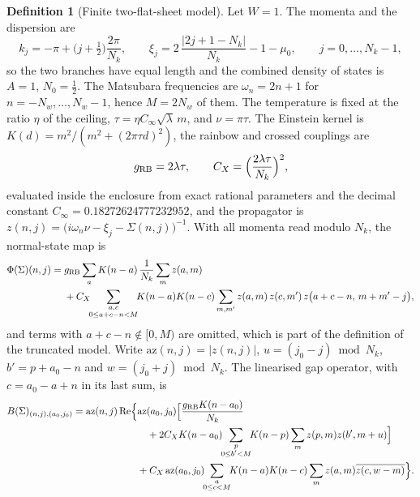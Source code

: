 \documentclass[11pt]{article}
\newcommand{\Cinf}{C_\infty}
\theoremstyle{definition}
\newtheorem{definition}[theorem]{Definition}
\theoremstyle{remark}
\begin{document}
\begin{definition}[Finite two-flat-sheet model]\label{def:cert}
Let $W=1$. The momenta and the dispersion are
\begin{equation}\label{eq:certgrid}
k_j=-\pi+\Big(j+\tfrac12\Big)\frac{2\pi}{N_k},\qquad \xi_j=2\,\frac{|2j+1-N_k|}{N_k}-1-\mu_0,\qquad j=0,\dots,N_k-1,
\end{equation}
so the two branches have equal length and the combined density of states is $A=1$, $N_0=\tfrac12$. The Matsubara frequencies are $\omega_n=2n+1$ for $n=-N_w,\dots,N_w-1$, hence $M=2N_w$ of them. The temperature is fixed at the ratio $\eta$ of the ceiling, $\tau=\eta\Cinf\sqrt\lambda\,m$, and $\nu=\pi\tau$. The Einstein kernel is $K(d)=m^2/(m^2+(2\pi\tau d)^2)$, the rainbow and crossed couplings are
\begin{equation}\label{eq:certcouple}
g_{\rm RB}=2\lambda\tau,\qquad C_X=\Big(\frac{2\lambda\tau}{N_k}\Big)^2,
\end{equation}
evaluated inside the enclosure from exact rational parameters and the decimal constant $\Cinf=0.18272624777232952$, and the propagator is $z(n,j)=\big(i\omega_n\nu-\xi_j-\Sigma(n,j)\big)^{-1}$. With all momenta read modulo $N_k$, the normal-state map is
\begin{equation}\label{eq:certphi}
\begin{aligned}
\Phi(\Sigma)(n,j)={}&g_{\rm RB}\sum_a K(n-a)\,\frac{1}{N_k}\sum_m z(a,m)\\
&+C_X\!\!\sum_{\substack{a,c\\0\le a+c-n<M}}\!\!K(n-a)K(n-c)\sum_{m,m'}z(a,m)\,z(c,m')\,z\big(a+c-n,\,m+m'-j\big),
\end{aligned}
\end{equation}
and terms with $a+c-n\notin[0,M)$ are omitted, which is part of the definition of the truncated model. Write $\mathrm{az}(n,j)=|z(n,j)|$, $u=(j_0-j)\bmod N_k$, $b'=p+a_0-n$ and $w=(j_0+j)\bmod N_k$. The linearised gap operator, with $c=a_0-a+n$ in its last sum, is
\begin{equation}\label{eq:certB}
\begin{aligned}
B(\Sigma)_{(n,j),(a_0,j_0)}=\mathrm{az}(n,j)\,\mathrm{Re}\Big\{&\mathrm{az}(a_0,j_0)\Big[\frac{g_{\rm RB}K(n-a_0)}{N_k}\\
&\quad+2C_XK(n-a_0)\!\!\sum_{\substack{p\\0\le b'<M}}\!\!K(n-p)\sum_m z(p,m)z(b',m+u)\Big]\\
&+C_X\,\mathrm{az}(a_0,j_0)\!\!\sum_{\substack{a\\0\le c<M}}\!\!K(n-a)K(n-c)\sum_m z(a,m)\overline{z(c,w-m)}\Big\}.

\end{aligned}
\end{equation}
\end{definition}
\end{document}
